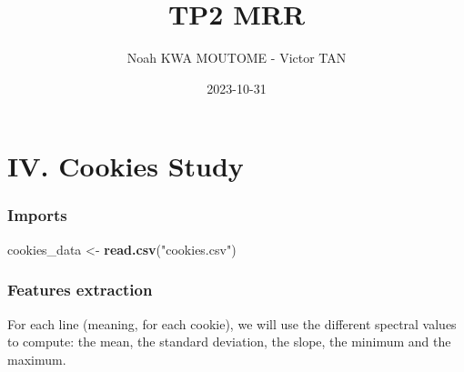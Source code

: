 \documentclass[
]{article}
\title{TP2 MRR}
\author{Noah KWA MOUTOME - Victor TAN}
\date{2023-10-31}
\newenvironment{Shaded}{\begin{snugshade}}{\end{snugshade}}
\newcommand{\FunctionTok}[1]{\textcolor[rgb]{0.13,0.29,0.53}{\textbf{#1}}}
\newcommand{\NormalTok}[1]{#1}
\newcommand{\OtherTok}[1]{\textcolor[rgb]{0.56,0.35,0.01}{#1}}
\newcommand{\StringTok}[1]{\textcolor[rgb]{0.31,0.60,0.02}{#1}}
\begin{document}
\maketitle

\section{IV. Cookies Study}\label{iv.-cookies-study}

\subsubsection{Imports}\label{imports}

\begin{Shaded}
\begin{Highlighting}[]
\NormalTok{cookies\_data }\OtherTok{\textless{}{-}} \FunctionTok{read.csv}\NormalTok{(}\StringTok{"cookies.csv"}\NormalTok{)}
\end{Highlighting}
\end{Shaded}

\subsubsection{Features extraction}\label{features-extraction}

For each line (meaning, for each cookie), we will use the different
spectral values to compute: the mean, the standard deviation, the slope,
the minimum and the maximum.
\end{document}
